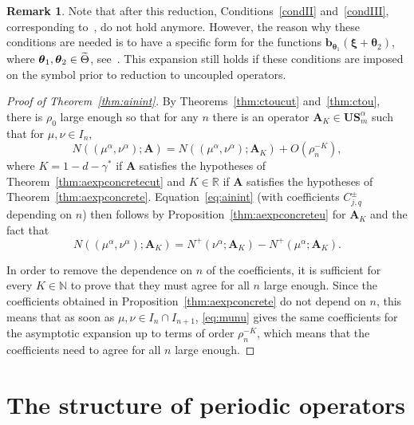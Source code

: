 \documentclass[10pt]{amsart}
\theoremstyle{definition}\newtheorem{defi}[theo]{Definition}\newtheorem{rema}[theo]{Remark}\newtheorem{exam}[theo]{Example}\newtheorem{nota}[theo]{Notation}
\newcommand{\R}{\mathbb R}
\newcommand{\N}{\mathbb N}
\newcommand{\btheta}{\boldsymbol \theta}
\newcommand{\bxi}{\boldsymbol \xi}
\newcommand{\BA}{\mathbf A}
\newcommand{\BS}{\mathbf S}
\newcommand{\BU}{\mathbf U}
\newcommand{\bbb}{\mathbf b}
\newcommand{\bigo}[1]{O\left(#1 \right)}
\let\oldtilde\tilde
\renewcommand*{\tilde}[1]{\mathchoice{\widetilde{#1}}{\widetilde{#1}}{\oldtilde{#1}}{\oldtilde{#1}}}
\begin{document}
\begin{rema}
Note that after this reduction, Conditions~\ref{condII} and~\ref{condIII}, corresponding to~\cite[Equation 2.4 and Condition B]{MorParSht2014}, do not hold anymore. However, the reason why these conditions are needed is to have a specific form for the functions $\bbb_{\btheta_1}(\bxi + \btheta_2)$, where $\btheta_1,\btheta_2 \in \tilde
\Theta$, see~\cite[Equation 10.5]{MorParSht2014}. This expansion still holds if these conditions are imposed on the symbol prior to reduction to uncoupled operators.
\end{rema}



\begin{proof}[Proof of Theorem~\ref{thm:ainint}]
By Theorems~\ref{thm:ctoucut} and~\ref{thm:ctou}, there is $\rho_0$ large enough so that for any $n$ there is an operator $\BA_K \in \BU\BS_m^\alpha$ such that for $\mu,\nu \in I_n$,
\begin{equation}
N((\mu^\alpha,\nu^\alpha);\BA) = N((\mu^\alpha,\nu^\alpha);\BA_K) +
\bigo{\rho_n^{-K}},
\end{equation}
where $K = 1- d - \gamma^*$ if $\BA$ satisfies the hypotheses of Theorem~\ref{thm:aexpconcretecut} and $K \in \R$ if $\BA$ satisfies the hypotheses of Theorem~\ref{thm:aexpconcrete}. Equation~\eqref{eq:ainint} (with coefficients $C^\pm_{j,q}$ depending on $n$) then follows by Proposition~\ref{thm:aexpconcreteu} for $\BA_K$ and the fact that
\begin{equation}\label{eq:munu}
N((\mu^\alpha,\nu^\alpha);\BA_K) = N^+(\nu^\alpha;\BA_K) - N^+(\mu^\alpha;\BA_K).
\end{equation}

In order to remove the dependence on $n$ of the coefficients, it is sufficient for every $K \in \N$ to prove that they must agree for all $n$ large enough. Since the coefficients obtained in Proposition~\ref{thm:aexpconcrete} do not depend on $n$, this means that as soon as $\mu, \nu \in I_{n} \cap I_{n+1}$, \eqref{eq:munu} gives the same coefficients for the asymptotic expansion up to terms of order $\rho_n^{-K}$, which means that the coefficients need to agree for all $n$ large enough.
\end{proof}



\section{The structure of periodic operators}\label{sec:periodic}
\end{document}
